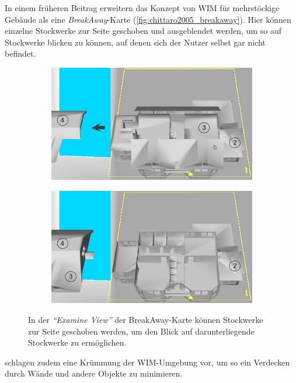 In einem früheren Beitrag erweitern \textcite{Chittaro2005} das Konzept von WIM für mehrstöckige Gebäude als eine \emph{BreakAway}-Karte (\autoref{fig:chittaro2005_breakaway}).
Hier können einzelne Stockwerke zur Seite geschoben und ausgeblendet werden, um so auf Stockwerke blicken zu können, auf denen sich der Nutzer selbst gar nicht befindet.
\begin{figure}[ptb]
    \begin{subfigure}{.49\textwidth}
        \includegraphics[width=\textwidth]{figures/chittaro2005_breakaway_a.png}
    \end{subfigure}
    \hfill
    \begin{subfigure}{.49\textwidth}
        \includegraphics[width=\textwidth]{figures/chittaro2005_breakaway_b.png}
    \end{subfigure}
    \caption{In der \emph{\enquote{Examine View}} der BreakAway-Karte können Stockwerke zur Seite geschoben werden, um den Blick auf darunterliegende Stockwerke zu ermöglichen. }
    \label{fig:chittaro2005_breakaway}
\end{figure}
\textcite{Vallance2001} schlagen zudem eine Krümmung der WIM-Umgebung vor, um so ein Verdecken durch Wände und andere Objekte zu minimieren.

